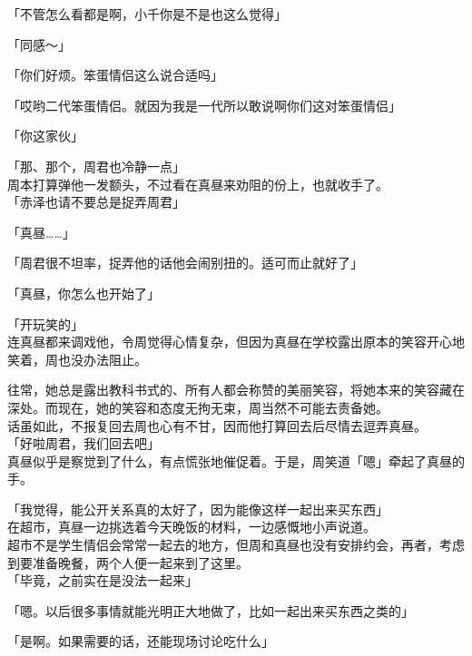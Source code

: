 「不管怎么看都是啊，小千你是不是也这么觉得」

「同感～」

「你们好烦。笨蛋情侣这么说合适吗」

「哎哟二代笨蛋情侣。就因为我是一代所以敢说啊你们这对笨蛋情侣」

「你这家伙」

「那、那个，周君也冷静一点」\\

周本打算弹他一发额头，不过看在真昼来劝阻的份上，也就收手了。\\

「赤泽也请不要总是捉弄周君」

「真昼……」

「周君很不坦率，捉弄他的话他会闹别扭的。适可而止就好了」

「真昼，你怎么也开始了」

「开玩笑的」\\

连真昼都来调戏他，令周觉得心情复杂，但因为真昼在学校露出原本的笑容开心地笑着，周也没办法阻止。

往常，她总是露出教科书式的、所有人都会称赞的美丽笑容，将她本来的笑容藏在深处。而现在，她的笑容和态度无拘无束，周当然不可能去责备她。\\

话虽如此，不报复回去周也心有不甘，因而他打算回去后尽情去逗弄真昼。\\

「好啦周君，我们回去吧」\\

真昼似乎是察觉到了什么，有点慌张地催促着。于是，周笑道「嗯」牵起了真昼的手。\\

\vspace{2\baselineskip}

「我觉得，能公开关系真的太好了，因为能像这样一起出来买东西」\\

在超市，真昼一边挑选着今天晚饭的材料，一边感慨地小声说道。\\

超市不是学生情侣会常常一起去的地方，但周和真昼也没有安排约会，再者，考虑到要准备晚餐，两个人便一起来到了这里。\\

「毕竟，之前实在是没法一起来」

「嗯。以后很多事情就能光明正大地做了，比如一起出来买东西之类的」

「是啊。如果需要的话，还能现场讨论吃什么」

